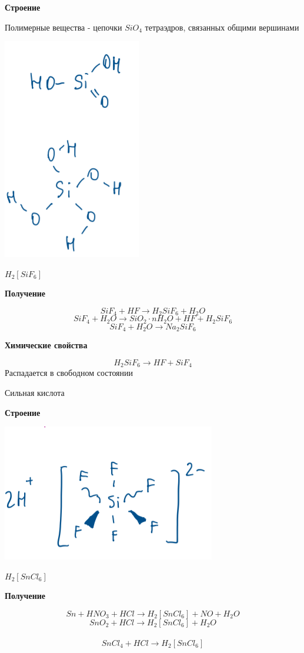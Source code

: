 \textbf{Строение}

Полимерные вещества - цепочки $SiO_4$ тетраэдров, связанных общими вершинами

\includegraphics{images/10v7.png}

$H_2[SiF_6]$

\textbf{Получение}

$$SiF_4 + HF \rightarrow H_2SiF_6 + H_2O$$
$$SiF_4 + H_2O \rightarrow SiO_2\cdot nH_2O + HF + H_2SiF_6$$
$$SiF_4 + H_2O \rightarrow Na_2SiF_6$$

\textbf{Химические свойства}

$$H_2SiF_6 \rightarrow HF + SiF_4$$
Распадается в свободном состоянии

Сильная кислота


\textbf{Строение}

\includegraphics{images/10v8.png}

$H_2[SnCl_6]$

\textbf{Получение}

$$Sn + HNO_3 + HCl \rightarrow H_2[SnCl_6] + NO + H_2O$$
$$SnO_2 + HCl \rightarrow H_2[SnCl_6] + H_2O$$\\
$$SnCl_4 + HCl \rightarrow H_2[SnCl_6]$$

